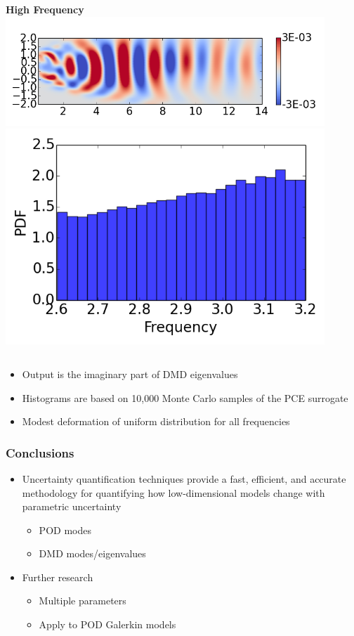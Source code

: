 \documentclass[9pt]{beamer}
\begin{document}
\begin{frame}
\begin{columns}[c]
   \centering
    \textbf{High Frequency} \\
    \includegraphics[width=0.9\textwidth]{DMDMode3} \\
    \includegraphics[width=0.9\textwidth]{PerturbDMDEigFastPDF}
\end{columns}

\begin{itemize}
\item Output is the imaginary part of DMD eigenvalues
\item Histograms are based on 10,000 Monte Carlo samples of the PCE surrogate
\item Modest deformation of uniform distribution for all frequencies
\end{itemize}
\end{frame}
\begin{frame}
\frametitle{Conclusions}
\label{sec-3-7}

\begin{itemize}
\item Uncertainty quantification techniques provide a fast, efficient, and
  accurate methodology for quantifying how low-dimensional models
  change with parametric uncertainty
\begin{itemize}
\item POD modes
\item DMD modes/eigenvalues
\end{itemize}
\item Further research
\begin{itemize}
\item Multiple parameters
\item Apply to POD Galerkin models
\end{itemize}
\end{itemize}
\end{frame}
\end{document}
